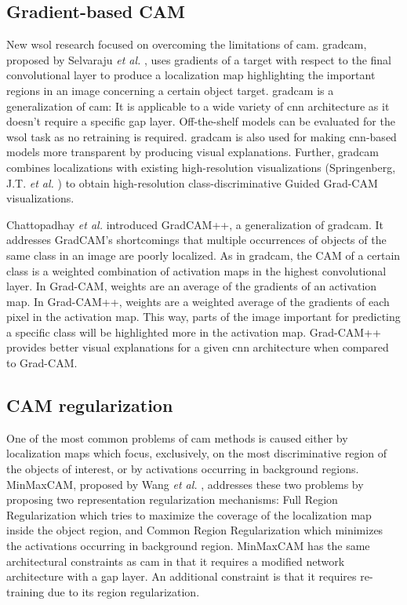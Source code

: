 \subsection{Gradient-based CAM}
New \acrshort{wsol} research focused on overcoming the limitations of \acrshort{cam}. \acrfull{gradcam}, proposed by Selvaraju \textit{et al.} \cite{selvaraju2017grad}, uses gradients of a target with respect to the final convolutional layer to produce a localization map highlighting the important regions in an image concerning a certain object target. \acrshort{gradcam} is a generalization of \acrshort{cam}: It is applicable to a wide variety of \acrshort{cnn} architecture as it doesn't require a specific \acrshort{gap} layer. Off-the-shelf models can be evaluated for the \acrshort{wsol} task as no retraining is required. \acrshort{gradcam} is also used for making \acrshort{cnn}-based models more transparent by producing visual explanations. Further, \acrshort{gradcam} combines localizations with existing high-resolution visualizations (Springenberg, J.T. \textit{et al.} \cite{springenberg2014striving}) to obtain high-resolution class-discriminative Guided Grad-CAM visualizations.

Chattopadhay \textit{et al.} \cite{chattopadhay2018grad, chattopadhyay2017grad} introduced GradCAM++, a generalization of \acrshort{gradcam}. It addresses GradCAM's shortcomings that multiple occurrences of objects of the same class in an image are poorly localized. As in \acrshort{gradcam}, the CAM of a certain class is a weighted combination of activation maps in the highest convolutional layer. In Grad-CAM, weights are an average of the gradients of an activation map. In Grad-CAM++, weights are a weighted average of the gradients of each pixel in the activation map. This way, parts of the image important for predicting a specific class will be highlighted more in the activation map. Grad-CAM++ provides better visual explanations for a given \acrshort{cnn} architecture when compared to Grad-CAM.

\subsection{CAM regularization}
One of the most common problems of \acrshort{cam} methods is caused either by localization maps which focus, exclusively, on the most discriminative region of the objects of interest, or by activations occurring in background regions. MinMaxCAM, proposed by Wang \textit{et al.} \cite{wang2021minmaxcam}, addresses these two problems by proposing two representation regularization mechanisms: Full Region Regularization which tries to maximize the coverage of the localization map inside the object region, and Common Region Regularization which minimizes the activations occurring in background region. MinMaxCAM has the same architectural constraints as \acrshort{cam} in that it requires a modified network architecture with a \acrshort{gap} layer. An additional constraint is that it requires re-training due to its region regularization.

